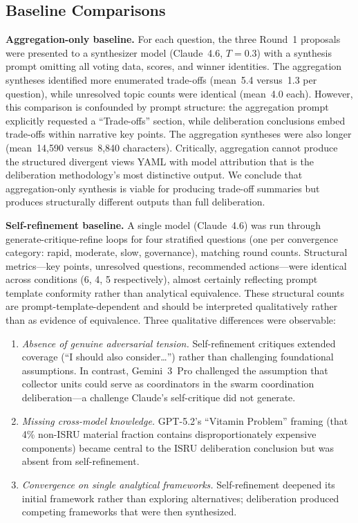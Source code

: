 \documentclass[11pt,a4paper]{article}
\begin{document}
\subsection{Baseline Comparisons}
\label{sec:baselines}

\textbf{Aggregation-only baseline.} For each question, the three Round~1 proposals were presented to a synthesizer model (Claude~4.6, $T = 0.3$) with a synthesis prompt omitting all voting data, scores, and winner identities. The aggregation syntheses identified more enumerated trade-offs (mean~5.4 versus~1.3 per question), while unresolved topic counts were identical (mean~4.0 each). However, this comparison is confounded by prompt structure: the aggregation prompt explicitly requested a ``Trade-offs'' section, while deliberation conclusions embed trade-offs within narrative key points. The aggregation syntheses were also longer (mean~14{,}590 versus~8{,}840 characters). Critically, aggregation cannot produce the structured divergent views YAML with model attribution that is the deliberation methodology's most distinctive output. We conclude that aggregation-only synthesis is viable for producing trade-off summaries but produces structurally different outputs than full deliberation.

\textbf{Self-refinement baseline.} A single model (Claude~4.6) was run through generate-critique-refine loops for four stratified questions (one per convergence category: rapid, moderate, slow, governance), matching round counts. Structural metrics---key points, unresolved questions, recommended actions---were identical across conditions (6, 4, 5 respectively), almost certainly reflecting prompt template conformity rather than analytical equivalence. These structural counts are prompt-template-dependent and should be interpreted qualitatively rather than as evidence of equivalence. Three qualitative differences were observable:

\begin{enumerate}[nosep]
    \item \emph{Absence of genuine adversarial tension.} Self-refinement critiques extended coverage (``I should also consider\ldots'') rather than challenging foundational assumptions. In contrast, Gemini~3~Pro challenged the assumption that collector units could serve as coordinators in the swarm coordination deliberation---a challenge Claude's self-critique did not generate.
    \item \emph{Missing cross-model knowledge.} GPT-5.2's ``Vitamin Problem'' framing (that 4\% non-ISRU material fraction contains disproportionately expensive components) became central to the ISRU deliberation conclusion but was absent from self-refinement.
    \item \emph{Convergence on single analytical frameworks.} Self-refinement deepened its initial framework rather than exploring alternatives; deliberation produced competing frameworks that were then synthesized.
\end{enumerate}
\end{document}

